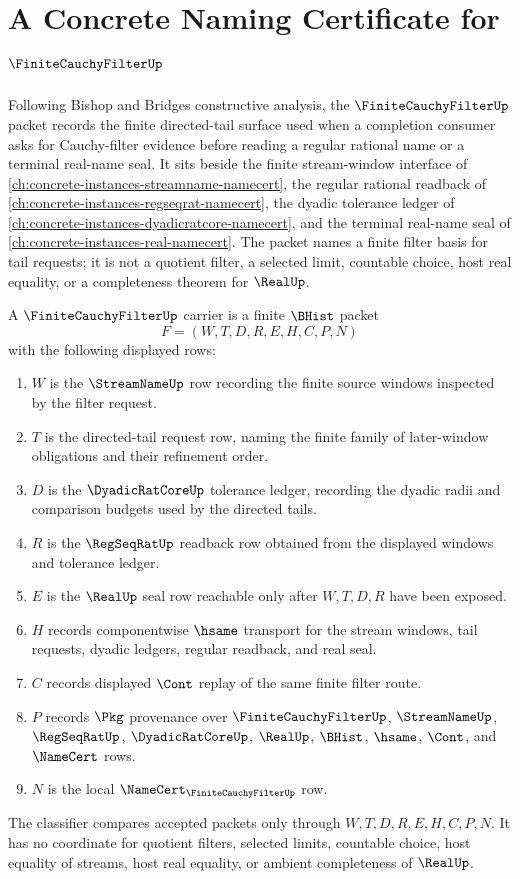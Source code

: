 \chapter{A Concrete Naming Certificate for $\FiniteCauchyFilterUp$}
\label{ch:concrete-instances-finite-cauchy-filter-namecert}

Following Bishop and Bridges constructive analysis, the $\FiniteCauchyFilterUp$ packet records the finite directed-tail surface used when a completion consumer asks for Cauchy-filter evidence before reading a regular rational name or a terminal real-name seal. It sits beside the finite stream-window interface of \autoref{ch:concrete-instances-streamname-namecert}, the regular rational readback of \autoref{ch:concrete-instances-regseqrat-namecert}, the dyadic tolerance ledger of \autoref{ch:concrete-instances-dyadicratcore-namecert}, and the terminal real-name seal of \autoref{ch:concrete-instances-real-namecert}. The packet names a finite filter basis for tail requests; it is not a quotient filter, a selected limit, countable choice, host real equality, or a completeness theorem for $\RealUp$.

\begin{definition}
\label{def:finite-cauchy-filter-carrier}
A $\FiniteCauchyFilterUp$ carrier is a finite $\BHist$ packet
$$
F=(W,T,D,R,E,H,C,P,N)
$$
with the following displayed rows:
\begin{enumerate}
\item $W$ is the $\StreamNameUp$ row recording the finite source windows inspected by the filter request.
\item $T$ is the directed-tail request row, naming the finite family of later-window obligations and their refinement order.
\item $D$ is the $\DyadicRatCoreUp$ tolerance ledger, recording the dyadic radii and comparison budgets used by the directed tails.
\item $R$ is the $\RegSeqRatUp$ readback row obtained from the displayed windows and tolerance ledger.
\item $E$ is the $\RealUp$ seal row reachable only after $W,T,D,R$ have been exposed.
\item $H$ records componentwise $\hsame$ transport for the stream windows, tail requests, dyadic ledgers, regular readback, and real seal.
\item $C$ records displayed $\Cont$ replay of the same finite filter route.
\item $P$ records $\Pkg$ provenance over $\FiniteCauchyFilterUp$, $\StreamNameUp$, $\RegSeqRatUp$, $\DyadicRatCoreUp$, $\RealUp$, $\BHist$, $\hsame$, $\Cont$, and $\NameCert$ rows.
\item $N$ is the local $\NameCert_{\FiniteCauchyFilterUp}$ row.
\end{enumerate}
The classifier compares accepted packets only through $W,T,D,R,E,H,C,P,N$. It has no coordinate for quotient filters, selected limits, countable choice, host equality of streams, host real equality, or ambient completeness of $\RealUp$.
\end{definition}

